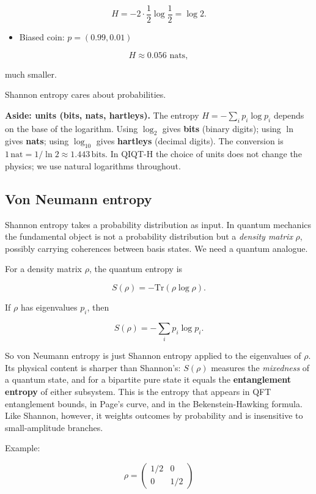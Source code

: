 \documentclass[11pt,a4paper]{article}
\newenvironment{qiqtquote}{\begin{mdframed}[style=quotestyle]}{\end{mdframed}}
\begin{document}
\[
H = -2\cdot \frac12 \log \frac12 = \log 2.
\]

\begin{itemize}
  \item Biased coin: $p=(0.99,0.01)$
\end{itemize}

\[
H \approx 0.056 \text{ nats},
\]

much smaller.

Shannon entropy cares about probabilities.

\begin{qiqtquote}
\textbf{Aside: units (bits, nats, hartleys).} The entropy $H = -\sum_i p_i \log p_i$ depends on the base of the logarithm. Using $\log_2$ gives \textbf{bits} (binary digits); using $\ln$ gives \textbf{nats}; using $\log_{10}$ gives \textbf{hartleys} (decimal digits). The conversion is $1\,\text{nat} = 1/\ln 2 \approx 1.443\,\text{bits}$. In QIQT-H the choice of units does not change the physics; we use natural logarithms throughout.
\end{qiqtquote}

\subsection{Von Neumann entropy}

Shannon entropy takes a probability distribution as input. In quantum mechanics the fundamental object is not a probability distribution but a \emph{density matrix} $\rho$, possibly carrying coherences between basis states. We need a quantum analogue.

For a density matrix $\rho$, the quantum entropy is

\[
S(\rho) = -\mathrm{Tr}(\rho \log \rho).
\]

If $\rho$ has eigenvalues $p_i$, then

\[
S(\rho) = -\sum_i p_i \log p_i.
\]

So von Neumann entropy is just Shannon entropy applied to the eigenvalues of $\rho$. Its physical content is sharper than Shannon's: $S(\rho)$ measures the \emph{mixedness} of a quantum state, and for a bipartite pure state it equals the \textbf{entanglement entropy} of either subsystem. This is the entropy that appears in QFT entanglement bounds, in Page's curve, and in the Bekenstein-Hawking formula. Like Shannon, however, it weights outcomes by probability and is insensitive to small-amplitude branches.

Example:

\[
\rho =
\begin{pmatrix}
1/2 & 0 \\
0 & 1/2
\end{pmatrix}
\]
\end{document}
